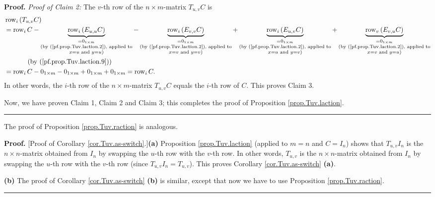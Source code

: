 \documentclass[numbers=enddot,12pt,final,onecolumn,notitlepage]{scrartcl}%
\theoremstyle{definition}
\newenvironment{proof}[1][Proof]{\noindent\textbf{#1.} }{\ \rule{0.5em}{0.5em}}
\begin{document}
\begin{proof}
\textit{Proof of Claim 2:} The $v$-th row of the $n\times m$-matrix $T_{u,v}C$
is%
\begin{align*}
&  \operatorname*{row}\nolimits_{i}\left(  T_{u,v}C\right) \\
&  =\operatorname*{row}\nolimits_{i}C-\underbrace{\operatorname*{row}%
\nolimits_{i}\left(  E_{u,u}C\right)  }_{\substack{=0_{1\times m}\\\text{(by
(\ref{pf.prop.Tuv.laction.2}), applied to}\\x=u\text{ and }y=u\text{)}%
}}-\underbrace{\operatorname*{row}\nolimits_{i}\left(  E_{v,v}C\right)
}_{\substack{=0_{1\times m}\\\text{(by (\ref{pf.prop.Tuv.laction.2}), applied
to}\\x=v\text{ and }y=v\text{)}}}+\underbrace{\operatorname*{row}%
\nolimits_{i}\left(  E_{u,v}C\right)  }_{\substack{=0_{1\times m}\\\text{(by
(\ref{pf.prop.Tuv.laction.2}), applied to}\\x=u\text{ and }y=v\text{)}%
}}+\underbrace{\operatorname*{row}\nolimits_{v}\left(  E_{v,u}C\right)
}_{\substack{=0_{1\times m}\\\text{(by (\ref{pf.prop.Tuv.laction.2}), applied
to}\\x=v\text{ and }y=u\text{)}}}\\
&  \ \ \ \ \ \ \ \ \ \ \left(  \text{by (\ref{pf.prop.Tuv.laction.9})}\right)
\\
&  =\operatorname*{row}\nolimits_{i}C-0_{1\times m}-0_{1\times m}+0_{1\times
m}+0_{1\times m}=\operatorname*{row}\nolimits_{i}C.
\end{align*}
In other words, the $i$-th row of the $n\times m$-matrix $T_{u,v}C$ equals the
$i$-th row of $C$. This proves Claim 3.

Now, we have proven Claim 1, Claim 2 and Claim 3; this completes the proof of
Proposition \ref{prop.Tuv.laction}.
\end{proof}

The proof of Proposition \ref{prop.Tuv.raction} is analogous.

\begin{proof}
[Proof of Corollary \ref{cor.Tuv.as-switch}.]\textbf{(a)} Proposition
\ref{prop.Tuv.laction} (applied to $m=n$ and $C=I_{n}$) shows that
$T_{u,v}I_{n}$ is the $n\times n$-matrix obtained from $I_{n}$ by swapping the
$u$-th row with the $v$-th row. In other words, $T_{u,v}$ is the $n\times
n$-matrix obtained from $I_{n}$ by swapping the $u$-th row with the $v$-th row
(since $T_{u,v}I_{n}=T_{u,v}$). This proves Corollary \ref{cor.Tuv.as-switch}
\textbf{(a)}.

\textbf{(b)} The proof of Corollary \ref{cor.Tuv.as-switch} \textbf{(b)} is
similar, except that now we have to use Proposition \ref{prop.Tuv.raction}.
\end{proof}
\end{document}

